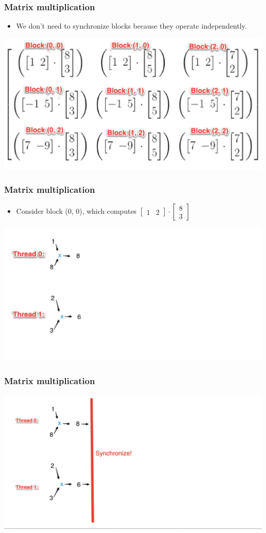 \documentclass[handout]{beamer}
\numberwithin{equation}{section}
\begin{document}
\begin{frame}
\frametitle{Matrix multiplication}
\begin{itemize}
\item We don't need to synchronize blocks because they operate independently.
\end{itemize}
\includegraphics[scale=0.4]{../../fig/mat}
\end{frame}

\begin{frame}
\frametitle{Matrix multiplication}
\begin{itemize}
\item Consider block (0, 0), which computes $\begin{bmatrix} 1 & 2 \end{bmatrix} \cdot \begin{bmatrix} 8 \\ 3 \end{bmatrix}$
\end{itemize}
\includegraphics[scale=0.4]{../../fig/matb1}
\end{frame}

\begin{frame}
\frametitle{Matrix multiplication}
\includegraphics[scale=0.2]{../../fig/matb2}
\end{frame}
\end{document}
